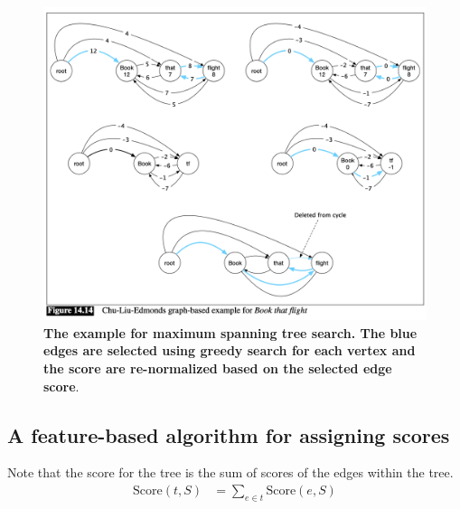 \documentclass[11pt]{article}
\begin{document}
\begin{figure}
\begin{minipage}[t]{1\linewidth}
  \centering
  \centerline{\includegraphics[scale = 0.4]{max_spanning_tree_example.png}}
\end{minipage}
\caption{\footnotesize{\textbf{The example for maximum spanning tree search. The blue edges are selected using greedy search for each vertex and the score are re-normalized based on the selected edge score}.}}
\label{fig: max_spanning_tree_example}
\end{figure}

\subsection{A feature-based algorithm for assigning scores}
Note that the score for the tree is the sum of scores of the edges within the tree. 
\begin{align*}
\text{Score}(t, S) &= \sum_{e \in t}\text{Score}(e, S)
\end{align*}
\end{document}
